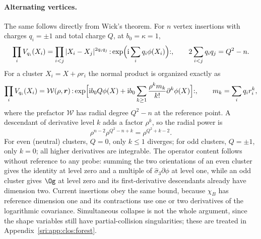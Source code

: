 \paragraph{Alternating vertices.} The same follows directly from Wick's theorem. For $n$ vertex insertions with charges
$q_i=\pm1$ and total charge $Q$, at $b_0=\kappa=1$,
\begin{equation}
 \prod_iV_{q_i}(X_i)=\prod_{i<j}|X_i-X_j|^{2q_iq_j}\,{:}\exp\Bigl(\mathrm i\sum_iq_i\phi(X_i)\Bigr){:},
 \qquad 2\sum_{i<j}q_iq_j=Q^2-n .
\end{equation}
For a cluster $X_i=X+\rho r_i$ the normal product is organized exactly as
\begin{equation}
 \prod_iV_{q_i}(X_i)=\mathcal W(\rho,\boldsymbol r)\,
 {:}\exp\Bigl[\mathrm i b_0Q\phi(X)+\mathrm i b_0\sum_{k\ge1}\frac{\rho^km_k}{k!}\partial^k\phi(X)\Bigr]{:},\qquad
 m_k=\sum_iq_ir_i^k,
 \label{sri:eq:clos:wick}
\end{equation}
where the prefactor $\mathcal W$ has radial degree $Q^2-n$ at the reference point. A descendant of derivative level $k$
adds a factor $\rho^k$, so the radial power is
\begin{equation}
 \rho^{n-2}\rho^{Q^2-n+k}=\rho^{Q^2+k-2}.
\end{equation}
For even (neutral) clusters, $Q=0$, only $k\le1$ diverges; for odd clusters, $Q=\pm1$, only $k=0$; all higher
derivatives are integrable. The operator content follows without reference to any probe: summing the two orientations
of an even cluster gives the identity at level zero and a multiple of $\hat\sigma_3\partial\phi$ at level one, while an
odd cluster gives $\Og$ at level zero and its first-derivative descendants already have dimension two. Current
insertions obey the same bound, because $\chi_B$ has reference dimension one and its contractions use one or two
derivatives of the logarithmic covariance. Simultaneous collapse is not the whole argument, since the shape variables
still have partial-collision singularities; these are treated in Appendix~\ref{sri:app:clos:forest}.

